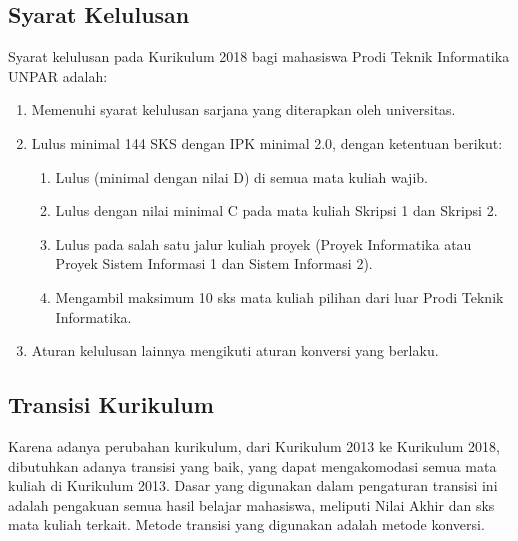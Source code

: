 \subsection{Syarat Kelulusan}

Syarat kelulusan pada Kurikulum 2018 bagi mahasiswa Prodi Teknik Informatika UNPAR adalah:
\begin{enumerate}
	\item Memenuhi syarat kelulusan sarjana yang diterapkan oleh universitas.
	\item Lulus minimal 144 SKS dengan IPK minimal 2.0, dengan ketentuan berikut:
	\begin{enumerate}
		\item Lulus (minimal dengan nilai D) di semua mata kuliah wajib.
		\item Lulus dengan nilai minimal C pada mata kuliah Skripsi 1 dan Skripsi 2.
		\item Lulus pada salah satu jalur kuliah proyek (Proyek Informatika atau Proyek Sistem Informasi 1 dan Sistem Informasi 2).
		\item Mengambil maksimum 10 sks mata kuliah pilihan dari luar Prodi Teknik Informatika.
	\end{enumerate}
	\item Aturan kelulusan lainnya mengikuti aturan konversi yang berlaku.
\end{enumerate}

\subsection{Transisi Kurikulum}

Karena adanya perubahan kurikulum, dari Kurikulum 2013 ke Kurikulum 2018, dibutuhkan adanya transisi yang baik, yang dapat mengakomodasi semua mata kuliah di Kurikulum 2013. Dasar yang digunakan dalam pengaturan transisi ini adalah pengakuan semua hasil belajar mahasiswa, meliputi Nilai Akhir dan sks mata kuliah terkait. Metode transisi yang digunakan adalah metode konversi.

